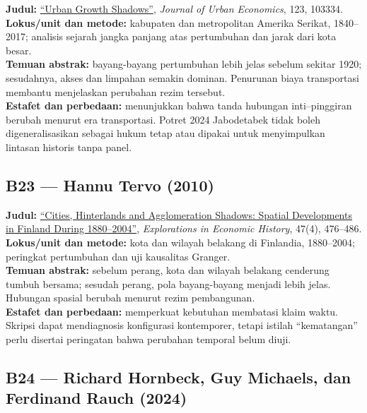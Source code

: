 \documentclass[
  indonesian,
  11pt,
  a4paper,
  oneside,
  openany]{report}
\begin{document}
\textbf{Judul:} \href{https://doi.org/10.1016/j.jue.2021.103334}{``Urban
Growth Shadows''}, \emph{Journal of Urban Economics}, 123, 103334.\\
\textbf{Lokus/unit dan metode:} kabupaten dan metropolitan Amerika
Serikat, 1840--2017; analisis sejarah jangka panjang atas pertumbuhan
dan jarak dari kota besar.\\
\textbf{Temuan abstrak:} bayang-bayang pertumbuhan lebih jelas sebelum
sekitar 1920; sesudahnya, akses dan limpahan semakin dominan. Penurunan
biaya transportasi membantu menjelaskan perubahan rezim tersebut.\\
\textbf{Estafet dan perbedaan:} menunjukkan bahwa tanda hubungan
inti--pinggiran berubah menurut era transportasi. Potret 2024
Jabodetabek tidak boleh digeneralisasikan sebagai hukum tetap atau
dipakai untuk menyimpulkan lintasan historis tanpa panel.

\subsection{B23 --- Hannu Tervo (2010)}\label{b23-hannu-tervo-2010}

\textbf{Judul:}
\href{https://doi.org/10.1016/j.eeh.2010.05.002}{``Cities, Hinterlands
and Agglomeration Shadows: Spatial Developments in Finland During
1880--2004''}, \emph{Explorations in Economic History}, 47(4),
476--486.\\
\textbf{Lokus/unit dan metode:} kota dan wilayah belakang di Finlandia,
1880--2004; peringkat pertumbuhan dan uji kausalitas Granger.\\
\textbf{Temuan abstrak:} sebelum perang, kota dan wilayah belakang
cenderung tumbuh bersama; sesudah perang, pola bayang-bayang menjadi
lebih jelas. Hubungan spasial berubah menurut rezim pembangunan.\\
\textbf{Estafet dan perbedaan:} memperkuat kebutuhan membatasi klaim
waktu. Skripsi dapat mendiagnosis konfigurasi kontemporer, tetapi
istilah ``kematangan'' perlu disertai peringatan bahwa perubahan
temporal belum diuji.

\subsection{B24 --- Richard Hornbeck, Guy Michaels, dan Ferdinand Rauch
(2024)}\label{b24-richard-hornbeck-guy-michaels-dan-ferdinand-rauch-2024}
\end{document}
